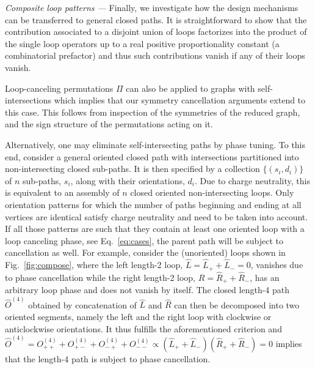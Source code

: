 \documentclass[twocolumn,floats,prx,showpacs]{revtex4-1}
\newcommand{\alex}[1]{{\color{alex} #1}}
\begin{document}
\emph{Composite loop patterns ---}
Finally, we investigate how the design mechanisms can be transferred to general closed paths. It is straightforward to show that the contribution associated to a disjoint union of loops factorizes into the product of the single loop operators up to a real positive proportionality constant (a combinatorial prefactor) and thus such contributions vanish if any of their loops vanish. 
\alex{Loop-canceling permutations $\Pi$ can also be applied  to graphs with self-intersections which implies that our symmetry cancellation arguments extend to this case. This follows from inspection of the symmetries of the reduced graph, and the sign structure of the permutations acting on it.

Alternatively, one may  eliminate  self-intersecting paths by phase tuning. To this end, consider a general oriented closed path with intersections partitioned into non-intersecting closed sub-paths. It is then specified by a collection $\{(s_i,d_i)\}$ of $n$ sub-paths, $s_i$, along with their orientations, $d_i$.  Due to charge neutrality, this is equivalent to an assembly of $n$ closed oriented non-intersecting loops. 
Only orientation patterns for which the number of paths beginning and ending at all vertices are identical satisfy charge neutrality and need to be taken into account. If all those patterns are such that they contain at least one oriented loop with a loop canceling phase, see Eq.~\eqref{eq:cases}, the parent path will be subject to cancellation as well. For example, consider the (unoriented) loops shown in Fig.~\ref{fig:compose}, where the left length-2 loop, $\hat L= \hat L_+ + \hat L_-=0$, vanishes due to phase cancellation while the right length-2 loop, $\hat R=\hat R_+ + \hat R_-$, has an arbitrary loop phase and does not vanish by itself. The closed length-4 path $\hat O^{(4)}$ obtained by concatenation of $\hat L$ and $\hat R$ can then be decomposed into two oriented segments, namely the left and the right loop with clockwise or anticlockwise orientations. It thus fulfills the aforementioned criterion and $\hat O^{(4)}=O^{(4)}_{++}+O^{(4)}_{+-}+O^{(4)}_{-+}+O^{(4)}_{--} \propto (\hat L_+ + \hat L_-)(\hat R_+ + \hat R_-)=0$ implies that the length-4 path is subject to phase cancellation.
}
\end{document}
